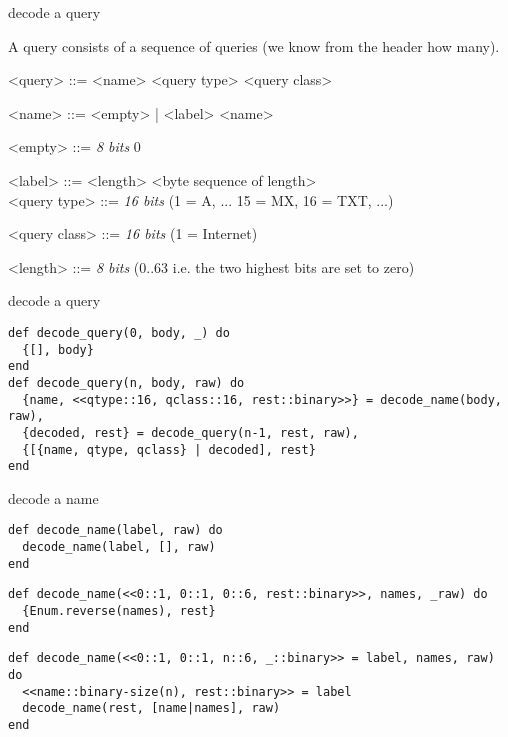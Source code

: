 \begin{frame}{decode a query}

A query consists of a sequence of queries (we know from the header how many).

\begin{grammar}
<query> ::= <name> <query type> <query class>

<name> ::= <empty> | <label> <name>

<empty> ::=  {\em 8 bits} 0 

<label> ::=  <length> <byte sequence of length> \\

<query type> ::= {\em 16 bits}  (1 = A, ... 15 = MX, 16 = TXT, ...)

<query class> ::= {\em 16 bits} (1 = Internet)

<length> ::= {\em 8 bits}  (0..63 i.e. the two highest bits are set to zero)

\end{grammar}


\end{frame}

\begin{frame}[fragile]{decode a query}

\begin{verbatim}
def decode_query(0, body, _) do
  {[], body}
end
def decode_query(n, body, raw) do
  {name, <<qtype::16, qclass::16, rest::binary>>} = decode_name(body, raw),
  {decoded, rest} = decode_query(n-1, rest, raw),
  {[{name, qtype, qclass} | decoded], rest}
end
\end{verbatim}

\end{frame}


\begin{frame}[fragile]{decode a name}

  
\begin{verbatim}
def decode_name(label, raw) do
  decode_name(label, [], raw)
end
\end{verbatim}
\begin{verbatim}
def decode_name(<<0::1, 0::1, 0::6, rest::binary>>, names, _raw) do  
  {Enum.reverse(names), rest}
end
\end{verbatim}

\begin{verbatim}
def decode_name(<<0::1, 0::1, n::6, _::binary>> = label, names, raw) do
  <<name::binary-size(n), rest::binary>> = label
  decode_name(rest, [name|names], raw)
end
\end{verbatim}
\end{frame}



